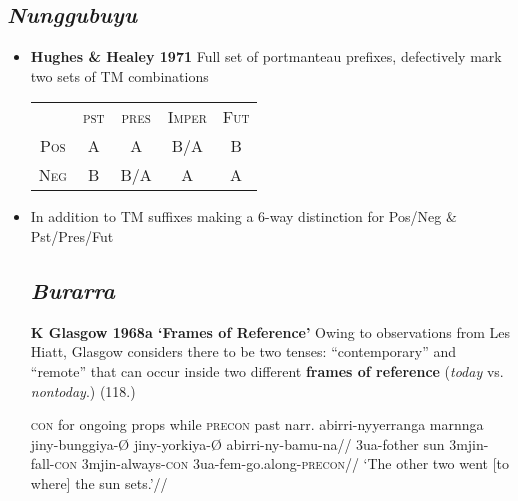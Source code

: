 \documentclass[10pt]{article}
\begin{document}
		\subsection{\textit{Nunggubuyu}}
		\begin{itemize}
			\item \textbf{Hughes \& Healey 1971} Full set of portmanteau prefixes, defectively mark two sets of TM combinations
			\begin{tabular}{ccccc}
								& \textsc{pst} & \textsc{pres} & \textsc{Imper} &\textsc{Fut}\\
					\textsc{Pos} & A & A & B/A & B \\
					\textsc{Neg} & B & B/A & A & A \\
						\end{tabular}
			\item In addition to TM suffixes making a 6-way distinction for Pos/Neg \& Pst/Pres/Fut
		\subsection{\textit{Burarra}}										
\item[\textbf{K Glasgow 1968a `Frames of Reference'}] Owing to observations from Les Hiatt, Glasgow considers there to be two tenses: ``contemporary'' and ``remote'' that can occur inside two different \textbf{frames of reference} (\textit{today} vs. \textit{nontoday}.) (118.)

\pex \textsc{con} for ongoing props while \textsc{precon} past narr.
\a\begingl\gla abirri-ny\textdblhyphen yerranga \nogloss{[} marnnga jiny-bunggiya-Ø jiny-yorkiya-Ø \nogloss{]} abirri-ny-bamu-na//
\glb 3ua-f\textdblhyphen other sun 3mjin-fall-\textsc{con} 3mjin-always-\textsc{con} 3ua-fem-go.along-\textsc{precon}//
\glft`The other two went [to where] the sun sets.'//\endgl\xe


\end{itemize}
\end{document}
